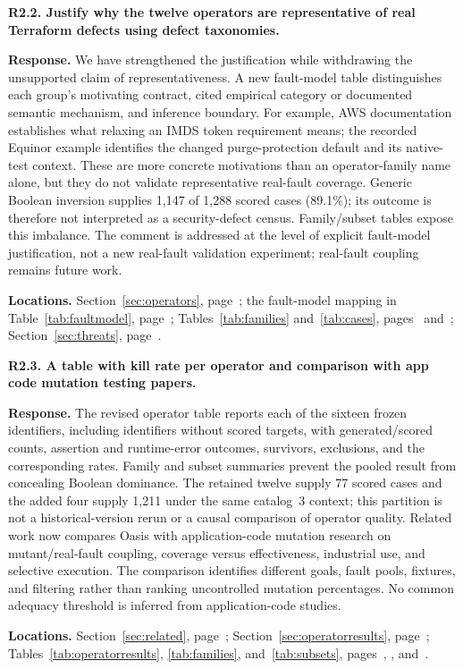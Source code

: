 \medskip
\noindent\textbf{R2.2. Justify why the twelve operators are representative of real Terraform defects using defect taxonomies.}\label{response:R2.2}\par
\textbf{Response.} We have strengthened the justification while withdrawing the unsupported claim of representativeness. A new fault-model table distinguishes each group's motivating contract, cited empirical category or documented semantic mechanism, and inference boundary. For example, AWS documentation establishes what relaxing an IMDS token requirement means; the recorded Equinor example identifies the changed purge-protection default and its native-test context. These are more concrete motivations than an operator-family name alone, but they do not validate representative real-fault coverage. Generic Boolean inversion supplies 1,147 of 1,288 scored cases (89.1\%); its outcome is therefore not interpreted as a security-defect census. Family/subset tables expose this imbalance. The comment is addressed at the level of explicit fault-model justification, not a new real-fault validation experiment; real-fault coupling remains future work.\par
\textbf{Locations.} Section~\ref{sec:operators}, page~\pageref{sec:operators}; the fault-model mapping in Table~\ref{tab:faultmodel}, page~\pageref{tab:faultmodel}; Tables~\ref{tab:families} and~\ref{tab:cases}, pages~\pageref{tab:families} and~\pageref{tab:cases}; Section~\ref{sec:threats}, page~\pageref{sec:threats}.

\medskip
\noindent\textbf{R2.3. A table with kill rate per operator and comparison with app code mutation testing papers.}\label{response:R2.3}\par
\textbf{Response.} The revised operator table reports each of the sixteen frozen identifiers, including identifiers without scored targets, with generated/scored counts, assertion and runtime-error outcomes, survivors, exclusions, and the corresponding rates. Family and subset summaries prevent the pooled result from concealing Boolean dominance. The retained twelve supply 77 scored cases and the added four supply 1,211 under the same catalog~3 context; this partition is not a historical-version rerun or a causal comparison of operator quality. Related work now compares Oasis with application-code mutation research on mutant/real-fault coupling, coverage versus effectiveness, industrial use, and selective execution. The comparison identifies different goals, fault pools, fixtures, and filtering rather than ranking uncontrolled mutation percentages. No common adequacy threshold is inferred from application-code studies.\par
\textbf{Locations.} Section~\ref{sec:related}, page~\pageref{sec:related}; Section~\ref{sec:operatorresults}, page~\pageref{sec:operatorresults}; Tables~\ref{tab:operatorresults}, \ref{tab:families}, and~\ref{tab:subsets}, pages~\pageref{tab:operatorresults}, \pageref{tab:families}, and~\pageref{tab:subsets}.

